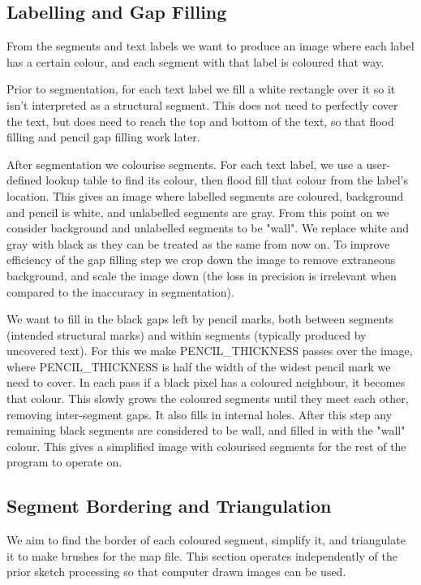 \documentclass{IEEEtran}
\begin{document}
\subsection{Labelling and Gap Filling}

From the segments and text labels we want to produce an image where each label has a certain colour, and each segment with that label is coloured that way.

Prior to segmentation, for each text label we fill a white rectangle over it so it isn't interpreted as a structural segment. This does not need to perfectly cover the text, but does need to reach the top and bottom of the text, so that flood filling and pencil gap filling work later.

After segmentation we colourise segments. For each text label, we use a user-defined lookup table to find its colour, then flood fill that colour from the label's location. This gives an image where labelled segments are coloured, background and pencil is white, and unlabelled segments are gray. From this point on we consider background and unlabelled segments to be "wall". We replace white and gray with black as they can be treated as the same from now on. To improve efficiency of the gap filling step we crop down the image to remove extraneous background, and scale the image down (the loss in precision is irrelevant when compared to the inaccuracy in segmentation). 

We want to fill in the black gaps left by pencil marks, both between segments (intended structural marks) and within segments (typically produced by uncovered text). For this we make PENCIL\_THICKNESS passes over the image, where PENCIL\_THICKNESS is half the width of the widest pencil mark we need to cover. In each pass if a black pixel has a coloured neighbour, it becomes that colour. This slowly grows the coloured segments until they meet each other, removing inter-segment gaps. It also fills in internal holes. After this step any remaining black segments are considered to be wall, and filled in with the "wall" colour. This gives a simplified image with colourised segments for the rest of the program to operate on.

\subsection{Segment Bordering and Triangulation}

We aim to find the border of each coloured segment, simplify it, and triangulate it to make brushes for the map file. This section operates independently of the prior sketch processing so that computer drawn images can be used.
\end{document}
